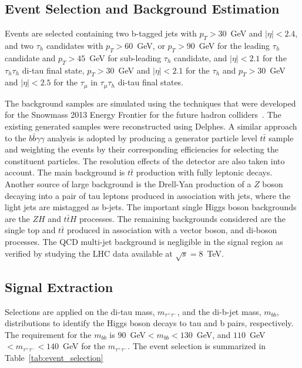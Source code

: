\subsection{Event Selection and Background Estimation}
Events are selected containing two b-tagged jets with $p_{T}>30$~GeV
and $|\eta|<2.4$, and two $\tau_{h}$ candidates with $p_{T}>60$~GeV, or $p_{T}>90$~GeV
for the leading $\tau_h$ candidate and $p_{T}>45$~GeV for sub-leading $\tau_h$ candidate, and
$|\eta|<2.1$ for the $\tau_{h}\tau_{h}$ di-tau final state, $p_{T}>30$~GeV
and $|\eta|<2.1$  for the $\tau_{h}$ and $p_{T}>30$~GeV and $|\eta|<2.5$
for the $\tau_{\mu}$ in $\tau_{\mu}\tau_{h}$ di-tau final states. 

The background samples are simulated using the techniques that were developed for the Snowmass 2013 Energy Frontier for the future hadron colliders~\cite{Avetisyan}. The existing generated samples were reconstructed using Delphes. A similar approach to the $b\bar{b}\gamma\gamma$ analysis is adopted by producing a generator particle level $t\bar{t}$ sample and weighting the events by their corresponding efficiencies for selecting the constituent particles. The resolution effects of the detector are also taken into account. The main background is $t\bar{t}$ production with fully leptonic decays. Another source of large background is the Drell-Yan
production of a $Z$ boson decaying into a pair of tau leptons
produced in association with jets, where the light jets are mistagged as b-jets. The important single Higgs boson backgrounds are the $ZH$ and  $t\bar{t}H$ processes. The remaining backgrounds considered are the single top and $t\bar{t}$ produced in association with a vector boson, and di-boson processes.
The QCD multi-jet background is negligible in the signal region as verified by studying the LHC data available at $\sqrt{s} = 8$~TeV. 

\subsection {Signal Extraction}
 Selections are applied on the di-tau mass, $m_{\tau^{+}\tau^{-}}$, and the di-b-jet mass, $m_{bb}$, distributions to identify
the Higgs boson decays to tau and b pairs, respectively. The requirement for the $m_{bb}$ is $90$~GeV$<m_{bb}<130$~GeV, and
$110$~GeV$<m_{\tau^{+}\tau^{-}}<140$~GeV for the $m_{\tau^{+}\tau^{-}}$. The event selection is summarized in Table~\ref{tab:event_selection} 

